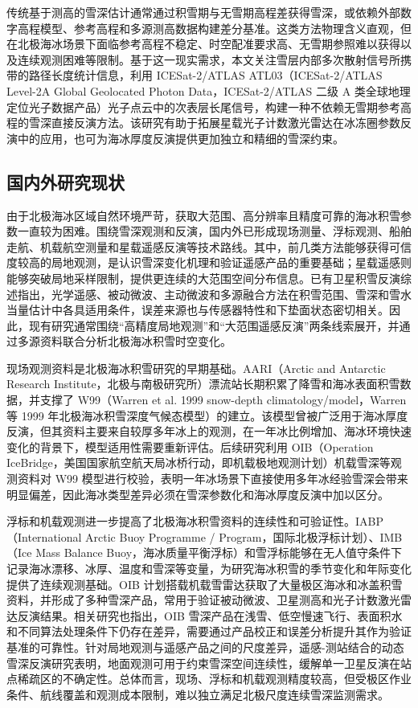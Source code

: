 传统基于测高的雪深估计通常通过积雪期与无雪期高程差获得雪深，或依赖外部数字高程模型、参考高程和多源测高数据构建差分基准。这类方法物理含义直观，但在北极海冰场景下面临参考高程不稳定、时空配准要求高、无雪期参照难以获得以及连续观测困难等限制。基于这一现实需求，本文关注雪层内部多次散射信号所携带的路径长度统计信息，利用 ICESat-2/ATLAS ATL03（ICESat-2/ATLAS Level-2A Global Geolocated Photon Data，ICESat-2/ATLAS 二级 A 类全球地理定位光子数据产品）光子点云中的次表层长尾信号，构建一种不依赖无雪期参考高程的雪深直接反演方法。该研究有助于拓展星载光子计数激光雷达在冰冻圈参数反演中的应用，也可为海冰厚度反演提供更加独立和精细的雪深约束。

\subsection{国内外研究现状}
由于北极海冰区域自然环境严苛，获取大范围、高分辨率且精度可靠的海冰积雪参数一直较为困难。围绕雪深观测和反演，国内外已形成现场测量、浮标观测、船舶走航、机载航空测量和星载遥感反演等技术路线。其中，前几类方法能够获得可信度较高的局地观测，是认识雪深变化机理和验证遥感产品的重要基础；星载遥感则能够突破局地采样限制，提供更连续的大范围空间分布信息。已有卫星积雪反演综述指出，光学遥感、被动微波、主动微波和多源融合方法在积雪范围、雪深和雪水当量估计中各具适用条件，误差来源也与传感器特性和下垫面状态密切相关\citep{wuyang2007snow}。因此，现有研究通常围绕“高精度局地观测”和“大范围遥感反演”两条线索展开，并通过多源资料联合分析北极海冰积雪时空变化。

现场观测资料是北极海冰积雪研究的早期基础。AARI（Arctic and Antarctic Research Institute，北极与南极研究所）漂流站长期积累了降雪和海冰表面积雪数据，并支撑了 W99（Warren et al. 1999 snow-depth climatology/model，Warren 等 1999 年北极海冰积雪深度气候态模型）的建立\citep{warren1999}。该模型曾被广泛用于海冰厚度反演，但其资料主要来自较厚多年冰上的观测，在一年冰比例增加、海冰环境快速变化的背景下，模型适用性需要重新评估。后续研究利用 OIB（Operation IceBridge，美国国家航空航天局冰桥行动，即机载极地观测计划）机载雪深等观测资料对 W99 模型进行校验，表明一年冰场景下直接使用多年冰经验雪深会带来明显偏差，因此海冰类型差异必须在雪深参数化和海冰厚度反演中加以区分\citep{kurtz_farrell2011,farrell2012,laxon2013,djepa2014}。

浮标和机载观测进一步提高了北极海冰积雪资料的连续性和可验证性。IABP（International Arctic Buoy Programme / Program，国际北极浮标计划）、IMB（Ice Mass Balance Buoy，海冰质量平衡浮标）和雪浮标能够在无人值守条件下记录海冰漂移、冰厚、温度和雪深等变量，为研究海冰积雪的季节变化和年际变化提供了连续观测基础\citep{guo2011,desch2017,nicolaus2018}。OIB 计划搭载机载雪雷达获取了大量极区海冰和冰盖积雪资料，并形成了多种雪深产品，常用于验证被动微波、卫星测高和光子计数激光雷达反演结果\citep{kurtz2013,newman2014}。相关研究也指出，OIB 雪深产品在浅雪、低空慢速飞行、表面积水和不同算法处理条件下仍存在差异，需要通过产品校正和误差分析提升其作为验证基准的可靠性\citep{kwok2018,roesel2021}。针对局地观测与遥感产品之间的尺度差异，遥感-测站结合的动态雪深反演研究表明，地面观测可用于约束雪深空间连续性，缓解单一卫星反演在站点稀疏区的不确定性\citep{zhaoliang2010dynamic}。总体而言，现场、浮标和机载观测精度较高，但受极区作业条件、航线覆盖和观测成本限制，难以独立满足北极尺度连续雪深监测需求。

